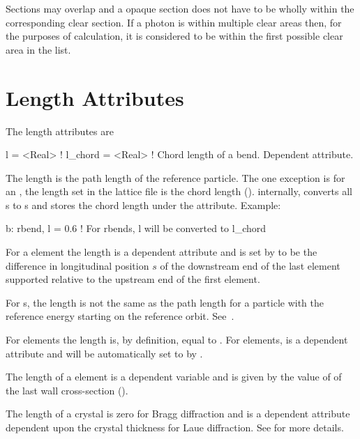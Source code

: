 Sections may overlap and a opaque section does not have to be wholly within the corresponding clear
section. If a photon is within multiple clear areas then, for the purposes of calculation, it is
considered to be within the first possible clear area in the list.

\section{Length Attributes}
\label{s:l}

The length attributes are
\begin{example}
  l       = <Real>  ! 
  l_chord = <Real>  ! Chord length of a bend. Dependent attribute.
\end{example}
The length  is the path length of the reference particle. The one exception is for an
, the length  set in the lattice file is the chord length
(). internally, \bmad converts all s to s and stores the chord
length under the  attribute.  Example:
\begin{example}
  b: rbend, l = 0.6   ! For rbends, l will be converted to l_chord
\end{example}

For a  element the length  is a dependent attribute and is set by \bmad to be the
difference in longitudinal position $s$ of the downstream end of the last element supported relative
to the upstream end of the first element.

For s, the length  is not the same as the path length for a particle with the
reference energy starting on the reference orbit. See~.

For  elements the  length is, by definition, equal to . For 
elements,  is a dependent attribute and will be automatically set to  by \bmad.

The length of a  element is a dependent variable and is given by the value of 
of the last wall cross-section ().

The length of a crystal is zero for Bragg diffraction and is a dependent attribute dependent upon
the crystal thickness for Laue diffraction. See  for more details.

